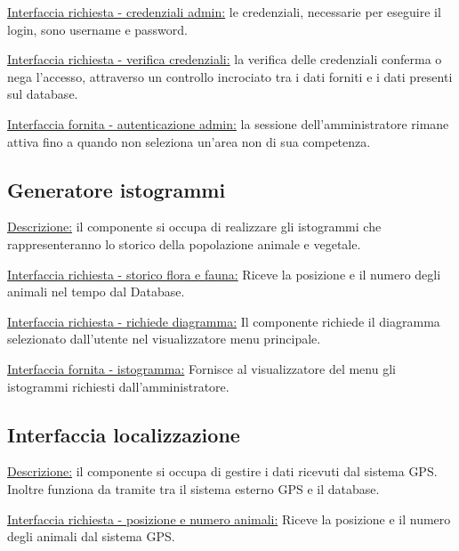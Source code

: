 \vspace{5mm}
\noindent
\underline{Interfaccia richiesta - credenziali admin:} le credenziali, necessarie per eseguire il login, sono username e password.

\vspace{5mm}
\noindent
\underline{Interfaccia richiesta - verifica credenziali:} la verifica delle credenziali conferma o nega l'accesso, attraverso un controllo incrociato tra i dati forniti e i dati presenti sul database.

\vspace{5mm}
\noindent
\underline{Interfaccia fornita - autenticazione admin:} la sessione dell'amministratore rimane attiva fino a quando non seleziona un'area non di sua competenza.

\subsection*{Generatore istogrammi}
\underline{Descrizione:} il componente si occupa di realizzare gli istogrammi che rappresenteranno lo storico della popolazione animale e vegetale.

\vspace{5mm}
\noindent
\underline{Interfaccia richiesta - storico flora e fauna:} Riceve la posizione e il numero degli animali nel tempo dal Database.

\vspace{5mm}
\noindent
\underline{Interfaccia richiesta - richiede diagramma:}
Il componente richiede il diagramma selezionato dall'utente nel visualizzatore menu principale.

\vspace{5mm}
\noindent
\underline{Interfaccia fornita - istogramma:} Fornisce al visualizzatore del menu gli istogrammi richiesti dall'amministratore.

\subsection*{Interfaccia localizzazione}
\underline{Descrizione:} il componente si occupa di gestire i dati ricevuti dal sistema GPS. Inoltre funziona da tramite tra il sistema esterno GPS e il database.

\vspace{5mm}
\noindent
\underline{Interfaccia richiesta - posizione e numero animali:} Riceve la posizione e il numero degli animali dal sistema GPS.

